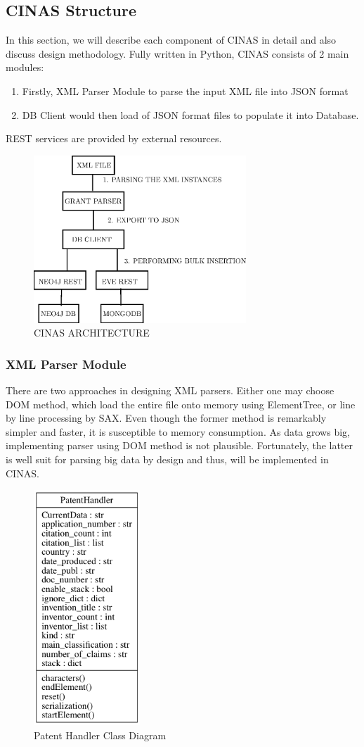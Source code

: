 \documentclass{sig-alternate}
\begin{document}
{\subsection{CINAS Structure}
In this section, we will describe each component of CINAS in detail and also discuss design methodology. Fully written in Python, CINAS consists of 2 main modules:
\begin{enumerate}
 \item Firstly, XML Parser Module to parse the input XML file into JSON format
 \item DB Client would then load of JSON format files to populate it into Database.
\end{enumerate}
REST services are provided by external resources.
\begin{figure}[!ht]
\centering
\includegraphics[width=80mm,scale=0.1]{cinasstruct.eps}
\caption{ CINAS ARCHITECTURE}
\end{figure}
\subsubsection{XML Parser Module}
There are two approaches in designing XML parsers. Either one may choose DOM method, which load the entire file onto memory using ElementTree, or line by line processing by SAX. Even though the former method is remarkably simpler and faster, it is susceptible to memory consumption. As data grows big, implementing parser using DOM method is not plausible. Fortunately, the latter is well suit for parsing big data by design and thus, will be implemented in CINAS.

\begin{figure}[htb]
\centering
\includegraphics[width=40mm,scale=10]{handler.png}
\caption{ Patent Handler Class Diagram}
\end{figure}

}
\end{document}
